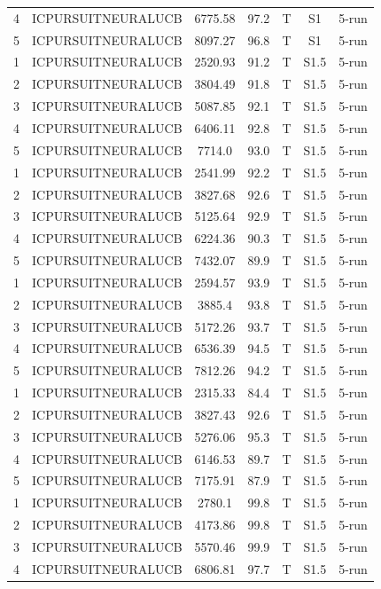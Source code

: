 \documentclass[11pt]{article}
\begin{document}
\begin{center}
\begin{longtable}{|c|c|c|c|c|c|c|}
4 & ICPURSUITNEURALUCB & 6775.58 & 97.2 & T & S1 & 5-run \\
5 & ICPURSUITNEURALUCB & 8097.27 & 96.8 & T & S1 & 5-run \\
1 & ICPURSUITNEURALUCB & 2520.93 & 91.2 & T & S1.5 & 5-run \\
2 & ICPURSUITNEURALUCB & 3804.49 & 91.8 & T & S1.5 & 5-run \\
3 & ICPURSUITNEURALUCB & 5087.85 & 92.1 & T & S1.5 & 5-run \\
4 & ICPURSUITNEURALUCB & 6406.11 & 92.8 & T & S1.5 & 5-run \\
5 & ICPURSUITNEURALUCB & 7714.0 & 93.0 & T & S1.5 & 5-run \\
1 & ICPURSUITNEURALUCB & 2541.99 & 92.2 & T & S1.5 & 5-run \\
2 & ICPURSUITNEURALUCB & 3827.68 & 92.6 & T & S1.5 & 5-run \\
3 & ICPURSUITNEURALUCB & 5125.64 & 92.9 & T & S1.5 & 5-run \\
4 & ICPURSUITNEURALUCB & 6224.36 & 90.3 & T & S1.5 & 5-run \\
5 & ICPURSUITNEURALUCB & 7432.07 & 89.9 & T & S1.5 & 5-run \\
1 & ICPURSUITNEURALUCB & 2594.57 & 93.9 & T & S1.5 & 5-run \\
2 & ICPURSUITNEURALUCB & 3885.4 & 93.8 & T & S1.5 & 5-run \\
3 & ICPURSUITNEURALUCB & 5172.26 & 93.7 & T & S1.5 & 5-run \\
4 & ICPURSUITNEURALUCB & 6536.39 & 94.5 & T & S1.5 & 5-run \\
5 & ICPURSUITNEURALUCB & 7812.26 & 94.2 & T & S1.5 & 5-run \\
1 & ICPURSUITNEURALUCB & 2315.33 & 84.4 & T & S1.5 & 5-run \\
2 & ICPURSUITNEURALUCB & 3827.43 & 92.6 & T & S1.5 & 5-run \\
3 & ICPURSUITNEURALUCB & 5276.06 & 95.3 & T & S1.5 & 5-run \\
4 & ICPURSUITNEURALUCB & 6146.53 & 89.7 & T & S1.5 & 5-run \\
5 & ICPURSUITNEURALUCB & 7175.91 & 87.9 & T & S1.5 & 5-run \\
1 & ICPURSUITNEURALUCB & 2780.1 & 99.8 & T & S1.5 & 5-run \\
2 & ICPURSUITNEURALUCB & 4173.86 & 99.8 & T & S1.5 & 5-run \\
3 & ICPURSUITNEURALUCB & 5570.46 & 99.9 & T & S1.5 & 5-run \\
4 & ICPURSUITNEURALUCB & 6806.81 & 97.7 & T & S1.5 & 5-run \\

\end{longtable}
\end{center}
\end{document}
